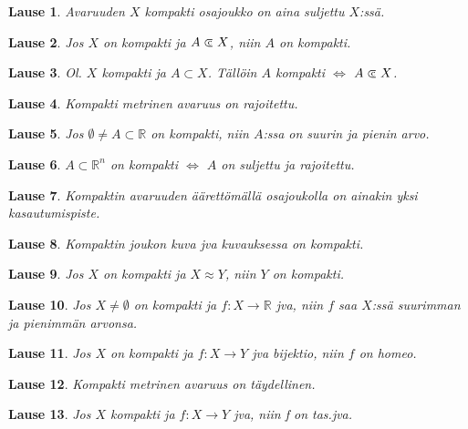 \documentclass[landscape,a4paper,9pt]{extarticle}
\newcommand\cls{\mathrel{\ooalign{$\subset$\cr
\hidewidth\raise.225ex\hbox{$\text{{\scriptsize c}}\mkern2mu$}\cr}}}
\theoremstyle{customtheoremstyle}
\newtheorem*{theorem}{Lause}
\begin{document}
\begin{multicols*}{3}

\begin{theorem}
  Avaruuden $X$ kompakti osajoukko on aina suljettu $X$:ssä.
\end{theorem}

\begin{theorem}
  Jos $X$ on kompakti ja $A \cls X$, niin $A$ on kompakti.
\end{theorem}

\begin{theorem}
  Ol. $X$ kompakti ja $A \subset X$. Tällöin $A$ kompakti $\iff$ $A \cls X$.
\end{theorem}

\begin{theorem}
  Kompakti metrinen avaruus on rajoitettu.
\end{theorem}

\begin{theorem}
  Jos $\emptyset \neq A \subset \mathbb{R}$ on kompakti, niin $A$:ssa on suurin
  ja pienin arvo.
\end{theorem}

\begin{theorem}
  $A \subset \mathbb{R}^n$ on kompakti $\iff$ $A$ on suljettu ja rajoitettu.
\end{theorem}

\begin{theorem}
  Kompaktin avaruuden äärettömällä osajoukolla on ainakin yksi kasautumispiste.
\end{theorem}

\begin{theorem}
  Kompaktin joukon kuva jva kuvauksessa on kompakti.
\end{theorem}

\begin{theorem}
  Jos $X$ on kompakti ja $X \approx Y$, niin $Y$ on kompakti.
\end{theorem}

\begin{theorem}
  Jos $X \neq \emptyset$ on kompakti ja $f: X \rightarrow \mathbb{R}$ jva, niin
  $f$ saa $X$:ssä suurimman ja pienimmän arvonsa.
\end{theorem}

\begin{theorem}
  Jos $X$ on kompakti ja $f: X \rightarrow Y$ jva bijektio, niin $f$ on homeo.
\end{theorem}

\begin{theorem}
  Kompakti metrinen avaruus on täydellinen.
\end{theorem}

\begin{theorem}
  Jos $X$ kompakti ja $f: X \rightarrow Y$ jva, niin f on tas.jva.
\end{theorem}


\end{multicols*}
\end{document}
